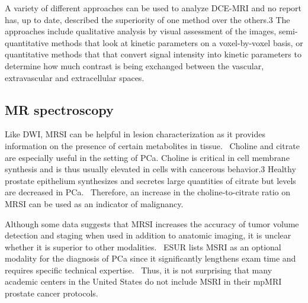 A variety of different approaches can be used to analyze DCE-MRI and no report
has, up to date, described the superiority of one method over the others.3 The
approaches include qualitative analysis by visual assessment of the images,
semi-quantitative methods that look at kinetic parameters on a voxel-by-voxel
basis, or quantitative methods that that convert signal intensity into kinetic
parameters to determine how much contrast is being exchanged between the
vascular, extravascular and extracellular spaces.~\cite{Gupta2013}
	
\subsection{MR spectroscopy}
Like DWI, MRSI can be helpful in lesion characterization as it provides
information on the presence of certain metabolites in
tissue.~\cite{Barentsz2012} Choline and citrate are especially useful in the
setting of PCa. Choline is critical in cell membrane synthesis and is thus
usually elevated in cells with cancerous behavior.3 Healthy prostate epithelium
synthesizes and secretes large quantities of citrate but levels are decreased
in PCa.~\cite{Costello1999,Kurhanewicz2002} Therefore, an increase in the
choline-to-citrate ratio on MRSI can be used as an indicator of
malignancy.~\cite{Bonekamp2011}

Although some data suggests that MRSI increases the accuracy of tumor volume
detection and staging when used in addition to anatomic imaging, it is unclear
whether it is superior to other modalities.~\cite{Bonekamp2011} ESUR lists MSRI
as an optional modality for the diagnosis of PCa since it significantly
lengthens exam time and requires specific technical
expertise.~\cite{Barentsz2012} Thus, it is not surprising that many academic
centers in the United States do not include MSRI in their mpMRI prostate cancer
protocols.~\cite{Gupta2013}
